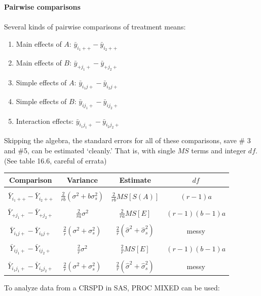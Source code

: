 \newpage
\textbf{Pairwise comparisons}\\~\\
Several kinds of pairwise comparisons of treatment means:
\begin{enumerate}
\item Main effects of $A$: $\bar{y}_{i_1++} - \bar{y}_{i_2++}$
\item Main effects of $B$: $\bar{y}_{+j_1+} - \bar{y}_{+j_2+}$
\item Simple effects of $A$: $\bar{y}_{i_1j+} - \bar{y}_{i_2j+}$
\item Simple effects of $B$: $\bar{y}_{ij_1+} - \bar{y}_{ij_2+}$
\item Interaction effects: $\bar{y}_{i_1j_1+} - \bar{y}_{i_2j_2+}$
\end{enumerate}


Skipping the algebra, the standard errors for all of these comparisons, save \# 3 and \#5, can be estimated `cleanly.'  That is, with single $MS$ terms and integer $df$.  (See table 16.6, careful of errata)

\begin{center}
\begin{tabular}{cccc} \hline
Comparison & Variance & Estimate & $df$ \\ \hline
& & & \\
$\bar{Y}_{i_1++} - \bar{Y}_{i_2++}$ & $\frac{2}{rb}(\sigma^2 + b \sigma_s^2)$ & $\frac{2}{rb}MS[S(A)]$ & $(r-1)a$ \\
& & & \\
$\bar{Y}_{+j_1+} - \bar{Y}_{+j_2+}$ & $\frac{2}{ra}\sigma^2$ & $\frac{2}{ra}MS[E]$ & $(r-1)(b-1)a$\\
& & & \\
$\bar{Y}_{i_1j+} - \bar{Y}_{i_2j+}$ & $\frac{2}{r}(\sigma^2 + \sigma_s^2)$ & $\frac{2}{r}(\hat\sigma^2 + \hat\sigma_s^2)$ & messy \\
& & & \\
$\bar{Y}_{ij_1+} - \bar{Y}_{ij_2+}$ & $\frac{2}{r}\sigma^2$ & $\frac{2}{r}MS[E]$ & $(r-1)(b-1)a$\\
& & & \\
$\bar{Y}_{i_1j_1+} - \bar{Y}_{i_2j_2+}$ & $\frac{2}{r}(\sigma^2 + \sigma_s^2)$ & $\frac{2}{r}(\hat\sigma^2 + \hat\sigma_s^2)$ & messy \\ \hline
\end{tabular}
\end{center}

To analyze data from a CRSPD in SAS, PROC MIXED can be used:

